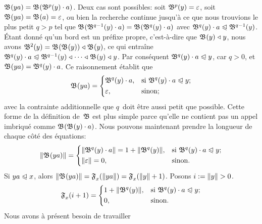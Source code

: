 \(\mathfrak{B}^{}(ya) = \mathfrak{B}^{}(\mathfrak{B}^{p}(y) \cdot a)\). Deux cas sont
possibles: soit \(\mathfrak{B}^{p}(y) = \varepsilon\), soit \(\mathfrak{B}^{}(ya)
= \mathfrak{B}^{}(a) = \varepsilon\), ou bien la recherche continue jusqu'à
ce que nous trouvions le plus petit \(q > p\) tel que
\(\mathfrak{B}^{}(\mathfrak{B}^{q-1}(y) \cdot a) = \mathfrak{B}^{}(\mathfrak{B}^{q}(y) \cdot
  a)\) avec \(\mathfrak{B}^{q}(y) \cdot a \mathrel{\trianglelefteqslant} \mathfrak{B}^{q-1}(y)\). Étant
donné qu'un bord est un préfixe propre, c'est-à-dire que
\(\mathfrak{B}^{}(y) \mathrel{\triangleleft} y\), nous avons \(\mathfrak{B}^{2}(y) =
\mathfrak{B}^{}(\mathfrak{B}^{}(y)) \mathrel{\triangleleft} \mathfrak{B}^{}(y)\), ce qui entraîne
\(\Border{q}{y} \cdot a \prefeq \Border{q-1}{y} \pref \dots \pref
\Border{}{y} \pref y\). Par conséquent \(\mathfrak{B}^{q}(y) \cdot a \mathrel{\trianglelefteqslant}
y\), car \({q > 0}\), et \(\mathfrak{B}^{}(ya) = \mathfrak{B}^{q}(y) \cdot a\). Ce
raisonnement établit que
\begin{equation*}
\mathfrak{B}^{}(ya) = 
\left\{
  \begin{aligned}
   & \mathfrak{B}^{q}(y) \cdot a,
   && \text{si \(\mathfrak{B}^{q}(y) \cdot a \mathrel{\trianglelefteqslant}y\)};\\
   & \varepsilon, 
   && \text{sinon;}
  \end{aligned}
\right.
\end{equation*}
avec la contrainte additionnelle que \(q\)~doit être aussi petit que
possible. Cette forme de la définition de~\(\mathfrak{B}\) est plus
simple parce qu'elle ne contient pas un appel imbriqué comme
\(\mathfrak{B}^{}(\mathfrak{B}^{}(y) \cdot a)\). Nous pouvons maintenant prendre
la longueur de chaque côté des équations:
\begin{equation*}
\lVert{\mathfrak{B}^{}(ya)}\rVert{} = 
\left\{
  \begin{aligned}
   & \lVert{\mathfrak{B}^{q}(y) \cdot a}\rVert{} = 1 + \lVert{\mathfrak{B}^{q}(y)}\rVert{},
   && \text{si \(\mathfrak{B}^{q}(y) \cdot a \mathrel{\trianglelefteqslant}y\)};\\
   & \lVert{\varepsilon}\rVert{} = 0,
   && \text{sinon.}
  \end{aligned}
\right.
\end{equation*}
Si \({ya \mathrel{\trianglelefteqslant} x}\), alors \(\lVert{\mathfrak{B}^{}(ya)}\rVert{} =
\mathfrak{F}_{x}^{}(\lVert{ya}\rVert{}) = \mathfrak{F}_{x}^{}(\lVert{y}\rVert{}+1)\). Posons \(i
:= \lVert{y}\rVert{} > 0\).
\begin{equation*}
\mathfrak{F}_{x}^{}(i+1) =
\left\{
  \begin{aligned}
   & 1 + \lVert{\mathfrak{B}^{q}(y)}\rVert{},
   && \text{si \(\mathfrak{B}^{q}(y) \cdot a \mathrel{\trianglelefteqslant}y\)};\\
   & 0,
   && \text{sinon.}
  \end{aligned}
\right.
\end{equation*}
Nous avons à présent besoin de travailler
